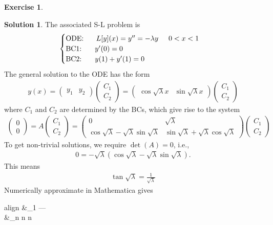 \documentclass{article}
\theoremstyle{definition}
\newtheorem*{exer*}{Exercise}
\newtheorem*{sln*}{Solution}
\newcommand{\C}{\mathbb{C}}
\newcommand{\f}[2]{\frac{#1}{#2}}
\begin{document}
\begin{exer*}
\begin{enumerate}
\begin{sln*}
			The associated S-L problem is
			\begin{align*}
			\begin{cases}
			\text{ODE: }\hspace{0.5cm} L[y](x) = y'' = -\lambda y\hspace{0.5cm} 0<x<1\\
			\text{BC1: }\hspace{0.5cm} y'(0) = 0\\
			\text{BC2: }\hspace{0.5cm} y(1) + y'(1) = 0
			\end{cases}
			\end{align*}
			The general solution to the ODE has the form
			\begin{align*}
			y(x) = \begin{pmatrix}
			y_1 & y_2
			\end{pmatrix}
			\begin{pmatrix}
			C_1\\C_2
			\end{pmatrix} = 
			\begin{pmatrix}
			\cos\sqrt{\lambda} x & \sin\sqrt{\lambda} x
			\end{pmatrix}
			\begin{pmatrix}
			C_1\\C_2
			\end{pmatrix}
			\end{align*}
			where $C_1$ and $C_2$ are determined by the BCs, which give rise to the system
			\begin{align*}
			\begin{pmatrix}
			0\\0
			\end{pmatrix} = A\begin{pmatrix}
			C_1\\C_2
			\end{pmatrix} = \begin{pmatrix}
			0 &  \sqrt{\lambda}  \\  \cos\sqrt{\lambda} - \sqrt{\lambda}\sin\sqrt{\lambda}  & \sin\sqrt{\lambda} + \sqrt{\lambda}\cos\sqrt{\lambda}
			\end{pmatrix}
			\begin{pmatrix}
			C_1\\C_2
			\end{pmatrix}
			\end{align*}
			To get non-trivial solutions, we require $\det(A) = 0$, i.e., 
			\begin{align*}
			0 =  - \sqrt{\lambda}(\cos\sqrt{\lambda} - \sqrt{\lambda}\sin\sqrt{\lambda}).
			\end{align*}
			This means
			\begin{align*}
			\boxed{\tan\sqrt{\lambda} = \f{1}{\sqrt{\lambda}}}
			\end{align*}
			Numerically approximate in Mathematica gives
			\begin{empheq}[box=\fbox]{align} 
			&\lambda_1 \approx --- \nonumber\\
			&\lambda_n \approx n \hspace{0.5cm} n \nonumber 
			\end{empheq}
			

\end{sln*}
\end{enumerate}
\end{exer*}
\end{document}

